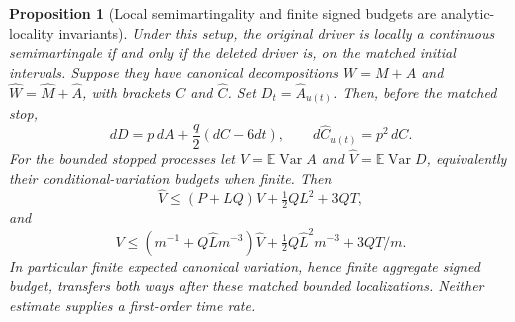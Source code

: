\documentclass[11pt]{article}
\newtheorem{proposition}[theorem]{Proposition}
\theoremstyle{definition}\newtheorem{definition}[theorem]{Definition}
\theoremstyle{remark}\newtheorem{remark}[theorem]{Remark}
\begin{document}
\begin{proposition}[Local semimartingality and finite signed budgets are analytic-locality invariants]
\label{prop:locality-budget-transfer}
Under this setup, the original driver is locally a continuous
semimartingale if and only if the deleted driver is, on the matched
initial intervals. Suppose they have canonical decompositions
$W=M+A$ and $\widehat W=\widehat M+\widehat A$, with brackets
$C$ and $\widehat C$. Set $D_t=\widehat A_{u(t)}$. Then, before the
matched stop,
\[
 dD=p\,dA+\frac q2(dC-6dt),\qquad
 d\widehat C_{u(t)}=p^2\,dC.
 \tag{LB3}
\]
For the bounded stopped processes let $V=\mathbb E\operatorname{Var}A$
and $\widehat V=\mathbb E\operatorname{Var}D$, equivalently their
conditional-variation budgets when finite. Then
\[
 \widehat V\le(P+LQ)V+\tfrac12QL^2+3QT,
 \tag{LB4}
\]
and
\[
 V\le\left(m^{-1}+Q\widehat Lm^{-3}\right)\widehat V
       +\tfrac12Q\widehat L^2m^{-3}+3QT/m.
 \tag{LB5}
\]
In particular finite expected canonical variation, hence finite aggregate
signed budget, transfers both ways after these matched bounded
localizations. Neither estimate supplies a first-order time rate.
\end{proposition}
\end{document}
